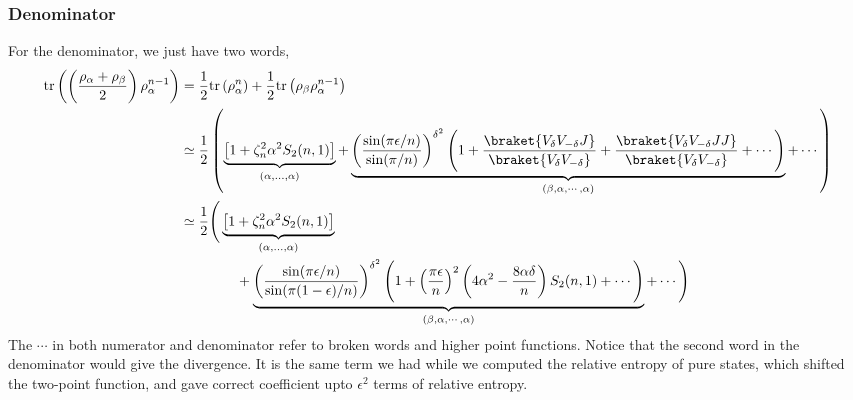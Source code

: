 \documentclass[11pt]{article}
\newcommand{\ep}{\epsilon}
\newcommand{\nn}{\nonumber}
\newcommand{\lb}{\left(}
\newcommand{\rb}{\right)}
\begin{document}
\subsubsection{Denominator}
For the denominator, we just have two words,
\begin{align}
    \text{tr}\lb \lb \frac{\rho_\alpha + \rho_\beta}{2}\rb \rho_\alpha^{n-1} \rb &= \frac{1}{2}\text{tr}\lb\rho_\alpha^n\rb + \frac{1}{2}\text{tr}\lb\rho_\beta \rho_\alpha^{n-1}\rb \\
    &\simeq  \frac{1}{2}\lb \underbrace{
    \left[1+\zeta_n^2\alpha^2 S_2(n,1)\right]
}_{(\alpha,\ldots,\alpha)}
+ \underbrace{\lb\frac{\sin(\pi\ep/n)}{\sin(\pi/n)}\rb^{\delta^2}\Bigg( 1 + \frac{\braket{V_\delta  V_{-\delta}J}}{\braket{V_\delta V_{-\delta}}}+ \frac{\braket{V_\delta  V_{-\delta}JJ}}{\braket{V_\delta V_{-\delta}}}+\cdots\Bigg)}_{(\beta,\alpha,\cdots,\alpha)} + \cdots \rb \\
&\simeq  \frac{1}{2}\Bigg( \underbrace{
    \left[1+\zeta_n^2\alpha^2 S_2(n,1)\right]
}_{(\alpha,\ldots,\alpha)}
\nn\\
&\qquad \qquad + \underbrace{\lb\frac{\sin(\pi\ep/n)}{\sin(\pi(1-\ep)/n)}\rb^{\delta^2}\Bigg( 1 + \lb\frac{\pi\ep}{n}\rb^2 \lb4\alpha^2 - \frac{8\alpha \delta}{n}\rb S_2(n,1)+ \cdots 
\Bigg)
}_{(\beta,\alpha,\cdots,\alpha)} + \cdots 
\Bigg)
\end{align}
The $\cdots$ in both numerator and denominator refer to broken words and higher point functions.
Notice that the second word in the denominator would give the divergence. It is the same term we had while we computed the relative entropy of pure states, which shifted the two-point function, and gave correct coefficient upto $\ep^2$ terms of relative entropy. 
\end{document}
